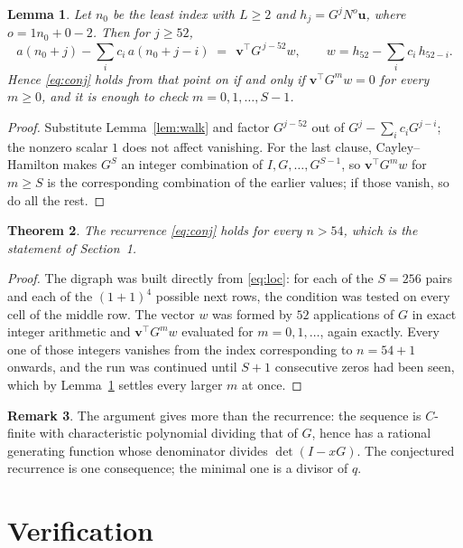 \documentclass[11pt,a4paper]{article}
\theoremstyle{plain}
\newtheorem{theorem}{Theorem}
\newtheorem{lemma}[theorem]{Lemma}
\theoremstyle{definition}
\newtheorem{remark}[theorem]{Remark}
\begin{document}
\begin{lemma}\label{lem:crit}
Let $n_0$ be the least index with $L\ge2$ and $h_j=G^{j}N^{o}\mathbf{u}$, where
$o=1n_0+0-2$. Then for $j\ge52$,
\[
a(n_0+j)-\sum_i c_i\,a(n_0+j-i)\;=\;\,\mathbf{v}^{\!\top}G^{\,j-52}w,
\qquad w=h_{52}-\sum_i c_i\,h_{52-i} .
\]
Hence \eqref{eq:conj} holds from that point on if and only if
$\mathbf{v}^{\!\top}G^{m}w=0$ for every $m\ge0$, and it is enough to check
$m=0,1,\dots,S-1$.
\end{lemma}

\begin{proof}
Substitute Lemma~\ref{lem:walk} and factor $G^{j-52}$ out of
$G^{j}-\sum_ic_iG^{j-i}$; the nonzero scalar $1$ does not affect
vanishing. For the last clause, Cayley--Hamilton makes $G^{S}$ an integer combination of
$I,G,\dots,G^{S-1}$, so $\mathbf{v}^{\!\top}G^{m}w$ for $m\ge S$ is the corresponding
combination of the earlier values; if those vanish, so do all the rest.
\end{proof}

\begin{theorem}
The recurrence \eqref{eq:conj} holds for every $n>54$, which is the statement of
Section~1.
\end{theorem}

\begin{proof}
The digraph was built directly from \eqref{eq:loc}: for each of the $S=256$ pairs and each
of the $(1+1)^{4}$ possible next rows, the condition was tested on every cell of
the middle row. The vector $w$ was formed by $52$ applications of $G$ in exact integer
arithmetic and $\mathbf{v}^{\!\top}G^{m}w$ evaluated for $m=0,1,\dots$, again exactly.
Every one of those integers vanishes from the index corresponding to $n=54+1$ onwards,
and the run was continued until $S+1$ consecutive zeros had been seen, which by
Lemma~\ref{lem:crit} settles every larger $m$ at once.
\end{proof}

\begin{remark}
The argument gives more than the recurrence: the sequence is $C$-finite with characteristic
polynomial dividing that of $G$, hence has a rational generating function whose denominator
divides $\det(I-xG)$. The conjectured recurrence is one consequence; the minimal one is a
divisor of $q$.
\end{remark}

\section{Verification}
\end{document}
